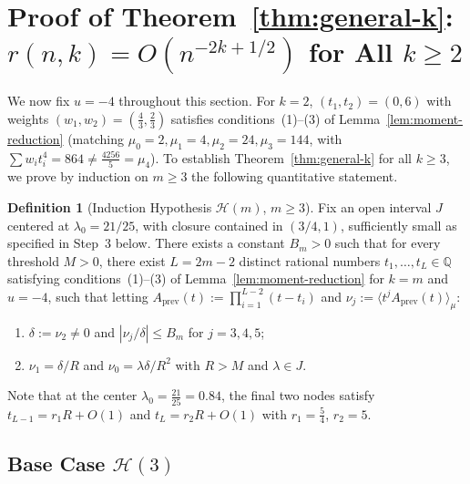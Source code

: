 \documentclass[11pt,a4paper]{article}
\theoremstyle{definition}
\newtheorem{definition}[theorem]{Definition}
\theoremstyle{remark}
\newcommand{\QQ}{\mathbb{Q}}
\begin{document}
\section{Proof of Theorem~\ref{thm:general-k}: $r(n, k) = O(n^{-2k + 1/2})$ for All $k \ge 2$}
\label{sec:general-k}

We now fix $u = -4$ throughout this section. For $k = 2$, $(t_1, t_2) = (0, 6)$ with weights $(w_1, w_2) = (\frac{4}{3}, \frac{2}{3})$ satisfies conditions~(1)--(3) of Lemma~\ref{lem:moment-reduction} (matching $\mu_0 = 2, \mu_1 = 4, \mu_2 = 24, \mu_3 = 144$, with $\sum w_i t_i^4 = 864 \neq \frac{4256}{5} = \mu_4$). To establish Theorem~\ref{thm:general-k} for all $k \ge 3$, we prove by induction on $m \ge 3$ the following quantitative statement.

\begin{definition}[Induction Hypothesis $\mathcal{H}(m)$, $m \ge 3$]
Fix an open interval $J$ centered at $\lambda_0=21/25$, with closure contained in $(3/4,1)$, sufficiently small as specified in Step~3 below. There exists a constant $B_m > 0$ such that for every threshold $M > 0$, there exist $L = 2m - 2$ distinct rational numbers $t_1, \dots, t_L \in \QQ$ satisfying conditions~(1)--(3) of Lemma~\ref{lem:moment-reduction} for $k = m$ and $u = -4$, such that letting $A_{\mathrm{prev}}(t) := \prod_{i=1}^{L-2} (t - t_i)$ and $\nu_j := \langle t^j A_{\mathrm{prev}}(t) \rangle_\mu$:
\begin{enumerate}
\item[(a)] $\delta := \nu_2 \neq 0$ and $|\nu_j / \delta| \le B_m$ for $j = 3, 4, 5$;
\item[(b)] $\nu_1 = \delta / R$ and $\nu_0 = \lambda \delta / R^2$ with $R > M$ and $\lambda \in J$.
\end{enumerate}
\end{definition}

Note that at the center $\lambda_0 = \frac{21}{25} = 0.84$, the final two nodes satisfy $t_{L-1} = r_1 R + O(1)$ and $t_L = r_2 R + O(1)$ with $r_1 = \frac{5}{4}$, $r_2 = 5$.

\subsection{Base Case $\mathcal{H}(3)$}
\end{document}
